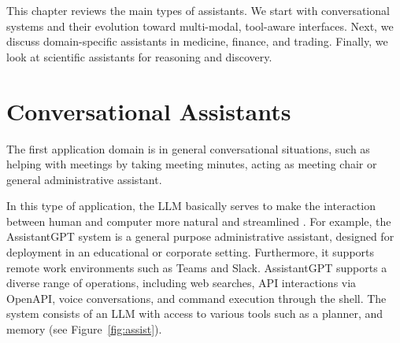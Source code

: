 This chapter reviews the main types of assistants.  
We start with conversational systems and their evolution toward multi-modal, tool-aware interfaces.  
Next, we discuss domain-specific assistants in medicine, finance, and trading.  
Finally, we look at scientific assistants for reasoning and discovery.





\section{Conversational  Assistants}

The first application domain is in general conversational situations, such as helping with meetings by taking  meeting minutes, acting as meeting chair or general administrative assistant.

In this type of application, the LLM basically serves to make the interaction between human and computer more natural and streamlined \citep{neszlenyi2024assistantgpt,oluwagbade2024conversational}. For example, the AssistantGPT system \citep{neszlenyi2024assistantgpt} is a  general purpose administrative assistant, designed for deployment in an educational or corporate
setting. Furthermore, it  supports remote work environments such as Teams and Slack. AssistantGPT supports a diverse range of operations, including web searches, API interactions via OpenAPI, voice conversations, and command execution through the shell. The system consists of an LLM with access to various tools such as a planner, and memory (see Figure~\ref{fig:assist}). 


